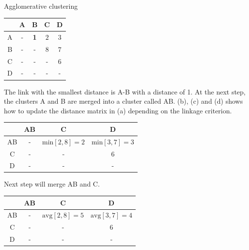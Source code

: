 \begin{example}
  \caption{Agglomerative clustering}
  \label{ex:agglomerative_clustering}

  \begin{subexample}{\linewidth}
    \centering
    \begin{tabular}{c|c c c c}
      \toprule
        & A & B & C & D \\
      \midrule
      A & - & \textbf{1} & $2$ & $3$ \\
      B & - & - & $8$ & $7$\\
      C & - & - & - & $6$ \\
      D & - & - & - & - \\
      \bottomrule
    \end{tabular}
  \end{subexample}

  \vspace{0.2cm}

  The link with the smallest distance is A-B with a distance of 1.
  At the next step, the clusters A and B are merged into a cluster called AB.
  (b), (c) and (d) shows how to update the distance matrix in (a) depending on the linkage criterion.

  \vspace{0.5cm}

  \begin{subexample}{\linewidth}
    \centering
    \begin{tabular}{c|c c c}
      \toprule
        & AB & C & D \\
      \midrule
      AB & - & $\text{min} \left[2, 8 \right] = 2$ & $\text{min} \left[3, 7 \right] = 3$ \\
      C  & - & - & $6$ \\
      D  & - & - & - \\
      \bottomrule
    \end{tabular}
  \end{subexample}

  \vspace{0.2cm}

  Next step will merge AB and C.

  \vspace{0.5cm}

  \begin{subexample}{\linewidth}
    \centering
    \begin{tabular}{c|c c c}
      \toprule
        & AB & C & D \\
      \midrule
      AB & - & $\text{avg} \left[2, 8 \right] = 5$ & $\text{avg} \left[3, 7 \right] = 4$ \\
      C  & - & - & $6$ \\
      D  & - & - & - \\
      \bottomrule
    \end{tabular}
  \end{subexample}


\end{example}
